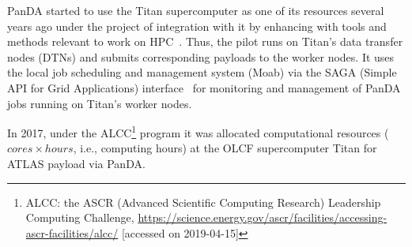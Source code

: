 PanDA started to use the Titan supercomputer as one of its resources several years ago under the project of integration with it by enhancing with tools and methods relevant to work on HPC~\cite{ref-titan-prodsys}. Thus, the pilot runs on Titan's data transfer nodes (DTNs) and submits corresponding payloads to the worker nodes. It uses the local job scheduling and management system (Moab) via the SAGA (Simple API for Grid Applications) interface~\cite{ref-saga} for monitoring and management of PanDA jobs running on Titan's worker nodes.

In 2017, under the ALCC\footnote{ALCC: the ASCR (Advanced Scientific Computing Research) Leadership Computing Challenge, \url{https://science.energy.gov/ascr/facilities/accessing-ascr-facilities/alcc/} [accessed on 2019-04-15]} program it was allocated computational resources ($cores \times hours$, i.e., computing hours) at the OLCF supercomputer Titan for ATLAS payload via PanDA.
